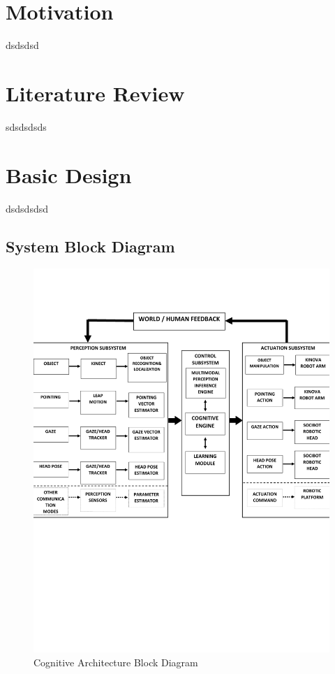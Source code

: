 \documentclass[11pt]{article}
\begin{document}
	\section{Motivation}
	dsdsdsd
	\section{Literature Review}
	sdsdsdsds
	\section{Basic Design}
	dsdsdsdsd
		\subsection{System Block Diagram}
		\label{subsec:SystemBlockDiagram}
			\begin{figure}[h]
				\includegraphics{BlockDiagram}
				\caption{Cognitive Architecture Block Diagram}
			\end{figure}
\end{document}
